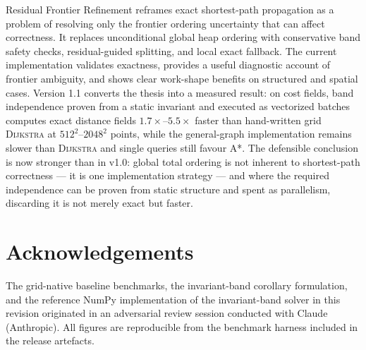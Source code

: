 \documentclass[11pt]{article}
\newcommand{\Dijkstra}{\textsc{Dijkstra}}
\begin{document}
Residual Frontier Refinement reframes exact shortest-path propagation as a problem of resolving only the frontier ordering uncertainty that can affect correctness. It replaces unconditional global heap ordering with conservative band safety checks, residual-guided splitting, and local exact fallback. The current implementation validates exactness, provides a useful diagnostic account of frontier ambiguity, and shows clear work-shape benefits on structured and spatial cases. Version 1.1 converts the thesis into a measured result: on cost fields, band independence proven from a static invariant and executed as vectorized batches computes exact distance fields $1.7\times$--$5.5\times$ faster than hand-written grid \Dijkstra{} at $512^2$--$2048^2$ points, while the general-graph implementation remains slower than \Dijkstra{} and single queries still favour A*. The defensible conclusion is now stronger than in v1.0: global total ordering is not inherent to shortest-path correctness --- it is one implementation strategy --- and where the required independence can be proven from static structure and spent as parallelism, discarding it is not merely exact but faster.

\section*{Acknowledgements}

The grid-native baseline benchmarks, the invariant-band corollary formulation, and the reference NumPy implementation of the invariant-band solver in this revision originated in an adversarial review session conducted with Claude (Anthropic). All figures are reproducible from the benchmark harness included in the release artefacts.
\end{document}
